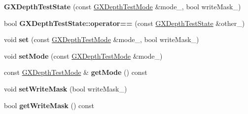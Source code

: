 \begin{DoxyCompactItemize}
\item 
{\bfseries G\+X\+Depth\+Test\+State} (const \hyperlink{class_magnum_1_1_g_x_depth_test_mode}{G\+X\+Depth\+Test\+Mode} \&mode\+\_\+, bool write\+Mask\+\_\+)\hypertarget{class_magnum_1_1_g_x_depth_test_state_a2ac80c10958fe4a9f08b53c4547a52a1}{}\label{class_magnum_1_1_g_x_depth_test_state_a2ac80c10958fe4a9f08b53c4547a52a1}

\item 
bool {\bfseries G\+X\+Depth\+Test\+State\+::operator==} (const \hyperlink{class_magnum_1_1_g_x_depth_test_state}{G\+X\+Depth\+Test\+State} \&other\+\_\+)\hypertarget{class_magnum_1_1_g_x_depth_test_state_a83f3a3da702e9595a1fef56eb5ca88e6}{}\label{class_magnum_1_1_g_x_depth_test_state_a83f3a3da702e9595a1fef56eb5ca88e6}

\item 
void {\bfseries set} (const \hyperlink{class_magnum_1_1_g_x_depth_test_mode}{G\+X\+Depth\+Test\+Mode} \&mode\+\_\+, bool write\+Mask\+\_\+)\hypertarget{class_magnum_1_1_g_x_depth_test_state_a27d6fa8ff47ae0e3895ab0d7a064387a}{}\label{class_magnum_1_1_g_x_depth_test_state_a27d6fa8ff47ae0e3895ab0d7a064387a}

\item 
void {\bfseries set\+Mode} (const \hyperlink{class_magnum_1_1_g_x_depth_test_mode}{G\+X\+Depth\+Test\+Mode} \&mode\+\_\+)\hypertarget{class_magnum_1_1_g_x_depth_test_state_ae8dcb9c07190b2af0be49b8967828dab}{}\label{class_magnum_1_1_g_x_depth_test_state_ae8dcb9c07190b2af0be49b8967828dab}

\item 
const \hyperlink{class_magnum_1_1_g_x_depth_test_mode}{G\+X\+Depth\+Test\+Mode} \& {\bfseries get\+Mode} () const \hypertarget{class_magnum_1_1_g_x_depth_test_state_a345fda43bc7bc9fcae1d74a05cab0f02}{}\label{class_magnum_1_1_g_x_depth_test_state_a345fda43bc7bc9fcae1d74a05cab0f02}

\item 
void {\bfseries set\+Write\+Mask} (bool write\+Mask\+\_\+)\hypertarget{class_magnum_1_1_g_x_depth_test_state_ad84edcaae1f4f76a65047df3736d112b}{}\label{class_magnum_1_1_g_x_depth_test_state_ad84edcaae1f4f76a65047df3736d112b}

\item 
bool {\bfseries get\+Write\+Mask} () const \hypertarget{class_magnum_1_1_g_x_depth_test_state_a95e4832c137f3e35c0e32bddc14a9df6}{}\label{class_magnum_1_1_g_x_depth_test_state_a95e4832c137f3e35c0e32bddc14a9df6}

\end{DoxyCompactItemize}


